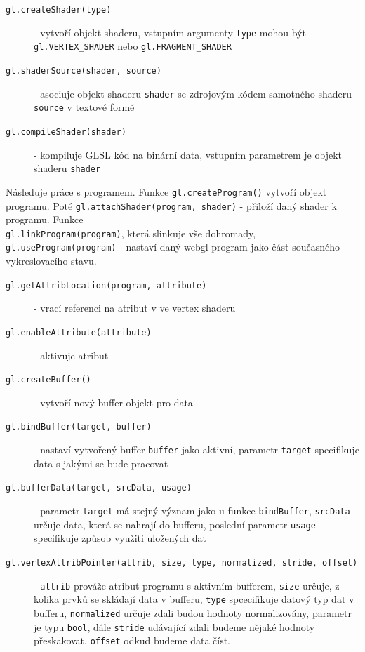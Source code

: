 \begin{description}
	\item[\texttt{gl.createShader(type)}] - vytvoří objekt shaderu, vstupním argumenty \texttt{type} mohou být \\ \texttt{gl.VERTEX\_SHADER} nebo \texttt{gl.FRAGMENT\_SHADER}

	\item[\texttt{gl.shaderSource(shader, source)}] - asociuje objekt shaderu \texttt{shader} se zdrojovým kódem samotného shaderu \texttt{source} v textové formě
	
	\item[\texttt{gl.compileShader(shader)}] - kompiluje GLSL kód na binární data, vstupním parametrem je objekt shaderu \texttt{shader}

\end{description}

Následuje práce s programem. Funkce \texttt{gl.createProgram()} vytvoří objekt programu. Poté \texttt{gl.attachShader(program, shader)} - přiloží daný shader k programu.
Funkce \\ \texttt{gl.linkProgram(program)}, která slinkuje vše dohromady, \texttt{gl.useProgram(program)} - nastaví daný webgl program jako část současného vykreslovacího stavu.

\begin{description}
 
	\item[\texttt{gl.getAttribLocation(program, attribute)}] - vrací referenci na atribut v ve vertex shaderu

	\item[\texttt{gl.enableAttribute(attribute)}] - aktivuje atribut 
	
	\item[\texttt{gl.createBuffer()}] - vytvoří nový buffer objekt pro data
	
	\item[\texttt{gl.bindBuffer(target, buffer)}] - nastaví vytvořený buffer \texttt{buffer} jako aktivní, parametr \texttt{target} specifikuje data s jakými se bude pracovat

	\item[\texttt{gl.bufferData(target, srcData, usage)}] - parametr \texttt{target} má stejný význam jako u funkce \texttt{bindBuffer}, \texttt{srcData} určuje data, která se nahrají do bufferu, poslední parametr \texttt{usage} specifikuje způsob využiti uložených dat

	\item[\texttt{gl.vertexAttribPointer(attrib, size, type, normalized, stride, offset)}] -  \texttt{attrib} prováže atribut programu s aktivním bufferem, \texttt{size} určuje, z kolika prvků se skládají data v bufferu, \texttt{type} spcecifikuje datový typ dat v bufferu, \texttt{normalized} určuje zdali budou hodnoty normalizovány, parametr je typu \texttt{bool}, dále \texttt{stride} udávající zdali budeme nějaké hodnoty přeskakovat, \texttt{offset} odkud budeme data číst.


\end{description}

